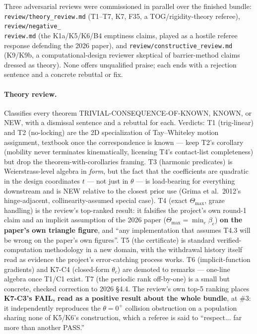 \documentclass[10pt,a4paper]{article}
\newcommand{\fn}[1]{\nolinkurl{#1}}
\begin{document}
Three adversarial reviews were commissioned in parallel over the finished bundle:
\fn{review/theory\_review.md} (T1--T7, K7, F35, a TOG/rigidity-theory referee), \fn{review/negative\_
review.md} (the K1a/K5/K6/B4 emptiness claims, played as a hostile referee response defending the
2026 paper), and \fn{review/constructive\_review.md} (K9/K9b, a computational-design reviewer
skeptical of barrier-method claims dressed as theory). None offers unqualified praise; each ends
with a rejection sentence and a concrete rebuttal or fix.

\paragraph{Theory review.} Classifies every theorem TRIVIAL-CONSEQUENCE-OF-KNOWN, KNOWN, or NEW,
with a dismissal sentence and a rebuttal for each. Verdicts: T1 (trig-linear) and T2 (no-locking)
are the 2D specialization of Tay--Whiteley motion assignment, textbook once the correspondence is
known --- keep T2's corollary (mobility never terminates kinematically, licensing T4's contact-list
completeness) but drop the theorem-with-corollaries framing. T3 (harmonic predicates) is
Weierstrass-level algebra in \emph{form}, but the fact that the coefficients are quadratic in the
design coordinates $t$ --- not just in $\theta$ --- is load-bearing for everything downstream and
is NEW relative to the closest prior use (Grima et al.\ 2012's hinge-adjacent, collinearity-assumed
special case). T4 (exact $\Theta_{\max}$, graze handling) is the review's top-ranked result: it
falsifies the project's own round-1 claim and an implicit assumption of the 2026 paper
($\Theta_{\max}=\min_e\beta_e$) \textbf{on the paper's own triangle figure}, and ``any
implementation that assumes T4.3 will be wrong on the paper's own figures''. T5 (the certificate)
is standard verified-computation methodology in a new domain, with the withdrawal history itself
read as evidence the project's error-catching process works. T6 (implicit-function gradients) and
K7-C4 (closed-form $\theta_c$) are demoted to remarks --- one-line algebra once T1/C1 exist. T7
(the periodic rank off-by-one) is a small but concrete, checked correction to 2026 \S4.4. The
review's own top-5 ranking places \textbf{K7-C3's FAIL, read as a positive result about the whole
bundle}, at \#3: it independently reproduces the $\theta=0^+$ collision obstruction on a
population sharing none of K5/K6's construction, which a referee is said to ``respect... far more
than another PASS.''
\end{document}
